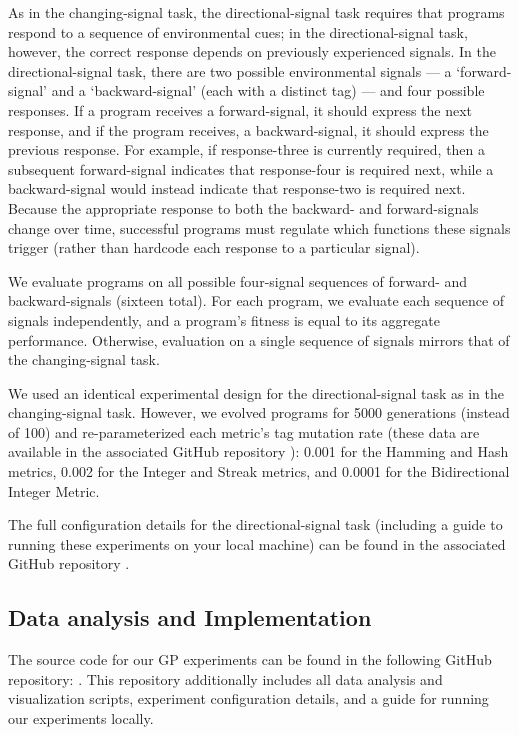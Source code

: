 As in the changing-signal task, the directional-signal task requires that programs respond to a sequence of environmental cues; in the directional-signal task, however, the correct response depends on previously experienced signals.
In the directional-signal task, there are two possible environmental signals --- a `forward-signal' and a `backward-signal' (each with a distinct tag) ---  and four possible responses.
If a program receives a forward-signal, it should express the next response, and if the program receives, a backward-signal, it should express the previous response.
For example, if response-three is currently required, then a subsequent forward-signal indicates that response-four is required next, while a backward-signal would instead indicate that response-two is required next.
Because the appropriate response to both the backward- and forward-signals change over time, successful programs must regulate which functions these signals trigger (rather than hardcode each response to a particular signal).

We evaluate programs on all possible four-signal sequences of forward- and backward-signals (sixteen total).
For each program, we evaluate each sequence of signals independently, and a program's fitness is equal to its aggregate performance.
Otherwise, evaluation on a single sequence of signals mirrors that of the changing-signal task.

We used an identical experimental design for the directional-signal task as in the changing-signal task.
However, we evolved programs for 5000 generations (instead of 100) and re-parameterized each metric's tag mutation rate (these data are available in the associated GitHub repository ):
0.001 for the Hamming and Hash metrics, 0.002 for the Integer and Streak metrics, and 0.0001 for the Bidirectional Integer Metric.

The full configuration details for the directional-signal task (including a guide to running these experiments on your local machine) can be found in the associated GitHub repository .

\subsection{Data analysis and Implementation}

The source code for our GP experiments can be found in the following GitHub repository: . This repository additionally includes all data analysis and visualization scripts, experiment configuration details, and a guide for running our experiments locally.
